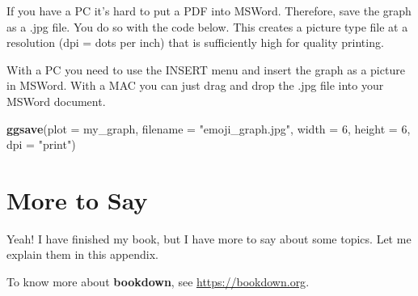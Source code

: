 \documentclass[
]{krantz}
\makeatletter
\newenvironment{Shaded}{\begin{snugshade}}{\end{snugshade}}
\newcommand{\DataTypeTok}[1]{\textcolor[rgb]{0.27,0.27,0.27}{#1}}
\newcommand{\DecValTok}[1]{\textcolor[rgb]{0.06,0.06,0.06}{#1}}
\newcommand{\KeywordTok}[1]{\textcolor[rgb]{0.27,0.27,0.27}{\textbf{#1}}}
\newcommand{\NormalTok}[1]{#1}
\newcommand{\StringTok}[1]{\textcolor[rgb]{0.5,0.5,0.5}{#1}}
\newenvironment{kframe}{%
\medskip{}
\setlength{\fboxsep}{.8em}
 \def\at@end@of@kframe{}%
 \ifinner\ifhmode%
  \def\at@end@of@kframe{\end{minipage}}%
  \begin{minipage}{\columnwidth}%
 \fi\fi%
 \def\FrameCommand##1{\hskip\@totalleftmargin \hskip-\fboxsep
 \colorbox{shadecolor}{##1}\hskip-\fboxsep
     \hskip-\linewidth \hskip-\@totalleftmargin \hskip\columnwidth}%
 \MakeFramed {\advance\hsize-\width
   \@totalleftmargin\z@ \linewidth\hsize
   \@setminipage}}%
 {\par\unskip\endMakeFramed%
 \at@end@of@kframe}
\renewenvironment{Shaded}{\begin{kframe}}{\end{kframe}}
\makeatother
\begin{document}
If you have a PC it's hard to put a PDF into MSWord. Therefore, save the graph as a .jpg file. You do so with the code below. This creates a picture type file at a resolution (dpi = dots per inch) that is sufficiently high for quality printing.

With a PC you need to use the INSERT menu and insert the graph as a picture in MSWord. With a MAC you can just drag and drop the .jpg file into your MSWord document.

\begin{Shaded}
\begin{Highlighting}[]
\KeywordTok{ggsave}\NormalTok{(}\DataTypeTok{plot =}\NormalTok{ my_graph, }
       \DataTypeTok{filename =} \StringTok{"emoji_graph.jpg"}\NormalTok{, }
       \DataTypeTok{width =} \DecValTok{6}\NormalTok{, }
       \DataTypeTok{height =} \DecValTok{6}\NormalTok{, }
       \DataTypeTok{dpi =} \StringTok{"print"}\NormalTok{)}
\end{Highlighting}
\end{Shaded}

\cleardoublepage

\hypertarget{appendix-appendix}{%
\appendix {}}


\hypertarget{more-to-say}{%
\chapter{More to Say}\label{more-to-say}}

Yeah! I have finished my book, but I have more to say about some topics. Let me explain them in this appendix.

To know more about \textbf{bookdown}, see \url{https://bookdown.org}.

  

\backmatter
\printindex
\end{document}
